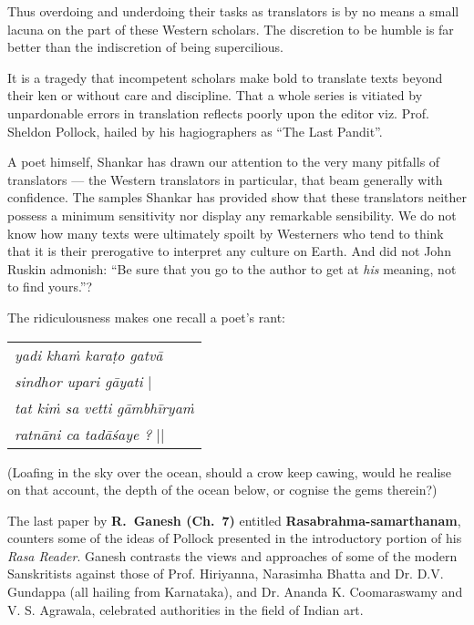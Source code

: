 Thus overdoing and underdoing their tasks as translators is by no means a small lacuna on the part of these Western scholars. The discretion to be humble is far better than the indiscretion of being supercilious.

It is a tragedy that incompetent scholars make bold to translate texts beyond their ken or without care and discipline. That a whole series is vitiated by unpardonable errors in translation reflects poorly upon the editor viz. Prof. Sheldon Pollock, hailed by his hagiographers as “The Last Pandit”.

A poet himself, Shankar has drawn our attention to the very many pitfalls of translators --- the Western translators in particular, that beam generally with confidence. The samples Shankar has provided show that these translators neither possess a minimum sensitivity nor display any remarkable sensibility. We do not know how many texts were ultimately spoilt by Westerners who tend to think that it is their prerogative to interpret any culture on Earth. And did not John Ruskin admonish: ``Be sure that you go to the author to get at \textsl{his} meaning, not to find yours.''?

The ridiculousness makes one recall a poet's rant:
\begin{center}
\begin{tabular}{l}
\textsl{yadi khaṁ karaṭo gatvā}\\
\phantom{aaaaaa}\textsl{sindhor upari gāyati} |\\
\textsl{tat kiṁ sa vetti gāmbhīryaṁ}\\
\phantom{aaaaaa}\textsl{ratnāni ca tadāśaye ?} ||
\end{tabular}
\end{center}
(Loafing in the sky over the ocean, should a crow keep cawing, would he realise on that account, the depth of the ocean below, or cognise the gems therein?) 

The last paper by {\bf R.~Ganesh (Ch.\ 7)} entitled {\bf Rasabrahma-samarthanam}, counters some of the ideas of Pollock presented in the introductory portion of his \textsl{Rasa Reader}. Ganesh contrasts the views and approaches of some of the modern Sanskritists against those of Prof. Hiriyanna, Narasimha Bhatta and Dr. D.V. Gundappa (all hailing from Karnataka), and Dr. Ananda K. Coomaraswamy and V. S. Agrawala, celebrated authorities in the field of Indian art.

